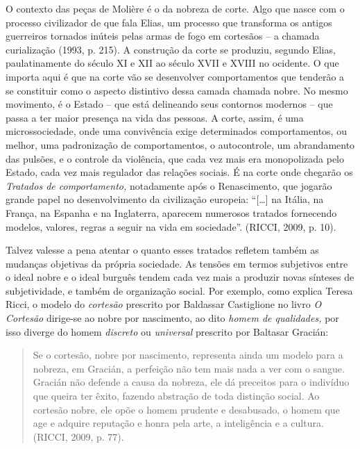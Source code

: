 O contexto das peças de Molière é o da nobreza de corte. Algo que nasce
com o processo civilizador de que fala Elias, um processo que transforma
os antigos guerreiros tornados inúteis pelas armas de fogo em cortesãos
-- a chamada curialização (1993, p. 215). A construção da corte se
produziu, segundo Elias, paulatinamente do século XI e XII ao século
XVII e XVIII no ocidente. O que importa aqui é que na corte vão se
desenvolver comportamentos que tenderão a se constituir como o aspecto
distintivo dessa camada chamada nobre. No mesmo movimento, é o Estado --
que está delineando seus contornos modernos -- que passa a ter maior
presença na vida das pessoas. A corte, assim, é uma microssociedade,
onde uma convivência exige determinados comportamentos, ou melhor, uma
padronização de comportamentos, o autocontrole, um abrandamento das
pulsões, e o controle da violência, que cada vez mais era monopolizada
pelo Estado, cada vez mais regulador das relações sociais. É na corte
onde chegarão os \emph{Tratados de comportamento,} notadamente após o
Renascimento, que jogarão grande papel no desenvolvimento da civilização
europeia: ``{[}\ldots{}{]} na Itália, na França, na Espanha e na
Inglaterra, aparecem numerosos tratados fornecendo modelos, valores,
regras a seguir na vida em sociedade''. (RICCI, 2009, p. 10).

Talvez valesse a pena atentar o quanto esses tratados refletem também as
mudanças objetivas da própria sociedade. As tensões em termos subjetivos
entre o ideal nobre e o ideal burguês tendem cada vez mais a produzir
novas sínteses de subjetividade, e também de organização social. Por
exemplo, como explica Teresa Ricci, o modelo do \emph{cortesão}
prescrito por Baldassar Castiglione no livro \emph{O Cortesão} dirige-se
ao nobre por nascimento, ao dito \emph{homem de qualidades,} por isso
diverge do homem \emph{discreto} ou \emph{universal} prescrito por
Baltasar Gracián:

\begin{quote}
Se o cortesão, nobre por nascimento, representa ainda um modelo para a
nobreza, em Gracián, a perfeição não tem mais nada a ver com o sangue.
Gracián não defende a causa da nobreza, ele dá preceitos para o
indivíduo que queira ter êxito, fazendo abstração de toda distinção
social. Ao cortesão nobre, ele opõe o homem prudente e desabusado, o
homem que age e adquire reputação e honra pela arte, a inteligência e a
cultura. (RICCI, 2009, p. 77).
\end{quote}

